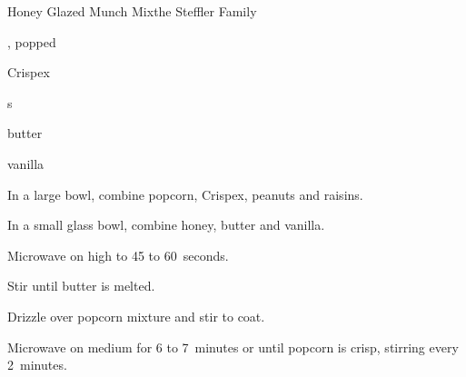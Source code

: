 \begin{recipe}{Honey Glazed Munch Mix}{the Steffler Family}{}

\begin{ingredients}
\item {} , popped 
\item {} Crispex 
\item \C{\half} s
\item \C{\quarter} 
\item \C{\quarter} 
\item \C{\quarter} butter
\item \tp{\quarter} vanilla
\end{ingredients}

\begin{directions}
\item In a large bowl, combine popcorn, Crispex, peanuts and raisins.
\item In a small glass bowl, combine honey, butter and vanilla.
\item Microwave on high to 45 to 60~seconds.
\item Stir until butter is melted.
\item Drizzle over popcorn mixture and stir to coat.
\item Microwave on medium for 6 to 7~minutes or until popcorn is crisp, stirring every 2~minutes.
\end{directions}
\end{recipe}
